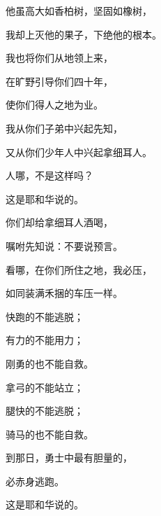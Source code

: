 {\par }{\Q 他虽高大如香柏树，坚固如橡树，
\par }{\Q 我却上灭他的果子，下绝他的根本。
\par }{\Q {}我也将你们从{}地领上来，
\par }{\Q 在旷野引导你们四十年，
\par }{\Q 使你们得{}人之地为业。
\par }{\Q {}我从你们子弟中兴起先知，
\par }{\Q 又从你们少年人中兴起拿细耳人。
\par }{人哪，不是这样吗？
\par }{\Q 这是耶和华说的。
\par }{\BB \par }{\Q {}你们却给拿细耳人酒喝，
\par }{\Q 嘱咐先知说：不要说预言。
\par }{\Q {}看哪，在你们所住之地，我必压{}，
\par }{\Q 如同装满禾捆的车压{}一样。
\par }{\Q {}快跑的不能逃脱；
\par }{\Q 有力的不能用力；
\par }{\Q 刚勇的也不能自救。
\par }{\Q {}拿弓的不能站立；
\par }{\Q 腿快的不能逃脱；
\par }{\Q 骑马的也不能自救。
\par }{\Q {}到那日，勇士中最有胆量的，
\par }{\Q 必赤身逃跑。
\par }{\Q 这是耶和华说的。

}
